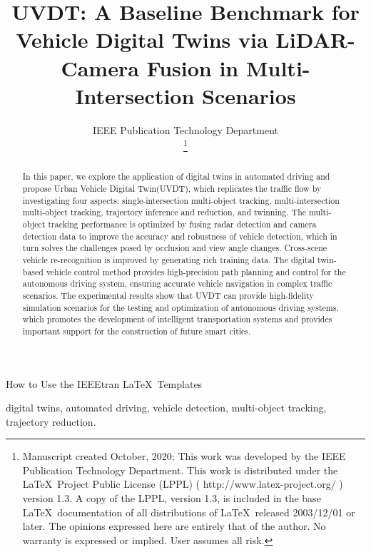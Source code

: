 \documentclass[lettersize,journal]{IEEEtran}
\begin{document}
\title{UVDT: A Baseline Benchmark for Vehicle Digital Twins via LiDAR-Camera Fusion in Multi-Intersection Scenarios}
\author{IEEE Publication Technology Department

\thanks{Manuscript created October, 2020; This work was developed by the IEEE Publication Technology Department. This work is distributed under the \LaTeX \ Project Public License (LPPL) ( http://www.latex-project.org/ ) version 1.3. A copy of the LPPL, version 1.3, is included in the base \LaTeX \ documentation of all distributions of \LaTeX \ released 2003/12/01 or later. The opinions expressed here are entirely that of the author. No warranty is expressed or implied. User assumes all risk.}}

%
{How to Use the IEEEtran \LaTeX \ Templates}

\maketitle

\begin{abstract}
In this paper, we explore the application of digital twins in automated driving and propose Urban Vehicle Digital Twin(UVDT), which replicates the traffic flow by investigating four aspects: single-intersection multi-object tracking, multi-intersection multi-object tracking, trajectory inference and reduction, and twinning. 
The multi-object tracking performance is optimized by fusing radar detection and camera detection data to improve the accuracy and robustness of vehicle detection, which in turn solves the challenges posed by occlusion and view angle changes. 
Cross-scene vehicle re-recognition is improved by generating rich training data. 
The digital twin-based vehicle control method provides high-precision path planning and control for the autonomous driving system, ensuring accurate vehicle navigation in complex traffic scenarios. 
The experimental results show that UVDT can provide high-fidelity simulation scenarios for the testing and optimization of autonomous driving systems, which promotes the development of intelligent transportation systems and provides important support for the construction of future smart cities.
\end{abstract}

\begin{IEEEkeywords}
digital twins, automated driving, vehicle detection, multi-object tracking, trajectory reduction.
\end{IEEEkeywords}
\end{document}
